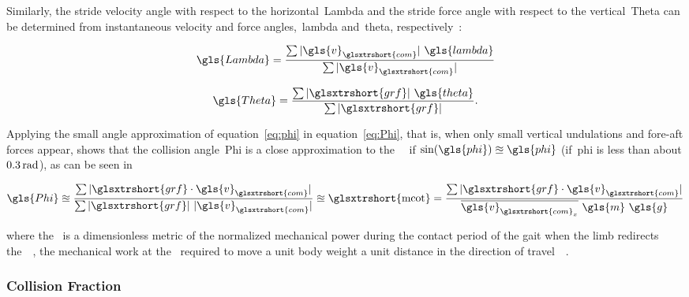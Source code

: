             Similarly, the stride velocity angle with respect to the horizontal~\gls{Lambda} and the stride force angle with respect to the vertical~\gls{Theta} can be determined from instantaneous velocity and force angles,~\gls{lambda} and~\gls{theta}, respectively~\cite{Lee2011}:

            \begin{align}
                \gls{Lambda} = \frac{\sum\vert\gls{v}_{\glsxtrshort{com}}\vert~\gls{lambda}}{\sum\vert\gls{v}_{\glsxtrshort{com}}\vert}
                \label{eq:Lambda}
            \end{align}

            \begin{align}
                \gls{Theta} = \frac{\sum\vert\glsxtrshort{grf}\vert~\gls{theta}}{\sum\vert\glsxtrshort{grf}\vert}.
                \label{eq:Theta}
            \end{align}
            
            Applying the small angle approximation of equation~\ref{eq:phi} in equation~\ref{eq:Phi}, that is, when only small vertical undulations and fore-aft forces appear, shows that the collision angle~\gls{Phi} is a close approximation to the~~\cite{Lee2011} if$~\textrm{sin}(\gls{phi}) \approxeq \gls{phi}$ (\ie if~\gls{phi} is less than about $0.3\,\textrm{\si{\radian}}$), as can be seen in

            \begin{align}
                \gls{Phi} \approxeq \frac{\sum\vert\glsxtrshort{grf} \cdot \gls{v}_{\glsxtrshort{com}}\vert}{\sum\vert\glsxtrshort{grf}\vert~\vert\gls{v}_{\glsxtrshort{com}}\vert} \approxeq \text{\glsxtrshort{mcot}} = \frac{\sum\vert\glsxtrshort{grf} \cdot \gls{v}_{\glsxtrshort{com}}\vert}{\overline{\gls{v}_{\glsxtrshort{com}_x}}~\gls{m}~\gls{g}}
                \label{eq:mcot}
            \end{align}

            where the~ is a dimensionless metric of the normalized mechanical power during the contact period of the gait when the limb redirects the~~\cite{Lee2013}, \ie the mechanical work at the~ required to move a unit body weight a unit distance in the direction of travel~\cite{Lee2011}~\cite{Cavagna1977}.
            
            \subsubsection{Collision Fraction}
            
